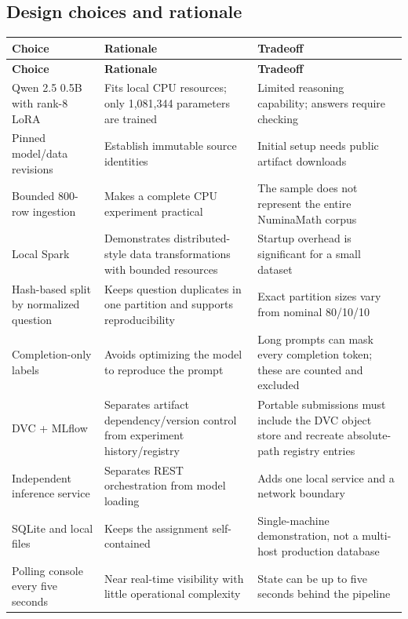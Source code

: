 \documentclass[11pt,a4paper]{article}
\begin{document}
\subsection*{Design choices and rationale}
\begingroup\small
\begin{longtable}{@{}>{\raggedright\arraybackslash}p{0.3333\dimexpr\textwidth-24pt\relax}>{\raggedright\arraybackslash}p{0.3333\dimexpr\textwidth-24pt\relax}>{\raggedright\arraybackslash}p{0.3333\dimexpr\textwidth-24pt\relax}@{}}
\toprule
\textbf{Choice} & \textbf{Rationale} & \textbf{Tradeoff} \\
\midrule
\endfirsthead
\textbf{Choice} & \textbf{Rationale} & \textbf{Tradeoff} \\
\midrule
\endhead
Qwen 2.5 0.5B with rank-8 LoRA & Fits local CPU resources; only 1,081,344 parameters are trained & Limited reasoning capability; answers require checking \\
Pinned model/data revisions & Establish immutable source identities & Initial setup needs public artifact downloads \\
Bounded 800-row ingestion & Makes a complete CPU experiment practical & The sample does not represent the entire NuminaMath corpus \\
Local Spark & Demonstrates distributed-style data transformations with bounded resources & Startup overhead is significant for a small dataset \\
Hash-based split by normalized question & Keeps question duplicates in one partition and supports reproducibility & Exact partition sizes vary from nominal 80/10/10 \\
Completion-only labels & Avoids optimizing the model to reproduce the prompt & Long prompts can mask every completion token; these are counted and excluded \\
DVC + MLflow & Separates artifact dependency/version control from experiment history/registry & Portable submissions must include the DVC object store and recreate absolute-path registry entries \\
Independent inference service & Separates REST orchestration from model loading & Adds one local service and a network boundary \\
SQLite and local files & Keeps the assignment self-contained & Single-machine demonstration, not a multi-host production database \\
Polling console every five seconds & Near real-time visibility with little operational complexity & State can be up to five seconds behind the pipeline \\
\bottomrule
\end{longtable}
\endgroup
\end{document}
